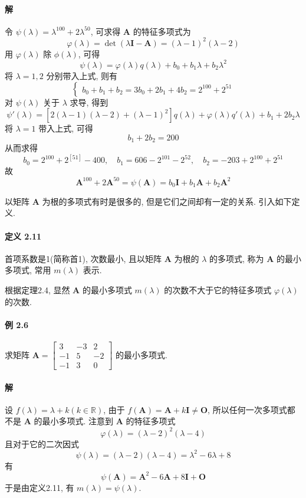 \paragraph*{解} 令 $\psi(\lambda) = \lambda^{100} + 2\lambda^{50}$, 可求得 $\bm{A}$ 的特征多项式为
$$
    \varphi(\lambda) = \det(\lambda\bm{I} - \bm{A}) = (\lambda - 1)^2(\lambda - 2)
$$
用 $\varphi(\lambda)$ 除 $\phi(\lambda)$, 可得
$$
    \psi(\lambda) = \varphi(\lambda)q(\lambda) + b_0 + b_1\lambda + b_2\lambda^2
$$
将 $\lambda = 1,2$ 分别带入上式, 则有
$$
    \begin{cases}
        b_0 + b_1 + b_2 = 3
        b_0 + 2b_1 + 4b_2 = 2^{100} + 2^{51}
    \end{cases}
$$
对 $\psi(\lambda)$ 关于 $\lambda$ 求导, 得到
$$
    \psi'(\lambda) = [2(\lambda - 1)(\lambda - 2) + (\lambda - 1)^2]q(\lambda) + \varphi(\lambda)q'(\lambda) + b_1 + 2b_2\lambda
$$
将 $\lambda = 1$ 带入上式, 可得
$$
    b_1 + 2b_2 = 200
$$
从而求得
$$
    b_0 = 2^{100} + 2^[51] - 400, \quad b_1 = 606 - 2^{101} - 2^{52}, \quad b_2 = -203 + 2^{100} + 2^{51}
$$
故
$$
    \bm{A}^{100} + 2\bm{A}^{50} = \psi(\bm{A}) = b_0\bm{I} + b_1\bm{A} + b_2\bm{A}^2
$$

\par 以矩阵 $\bm{A}$ 为根的多项式有时是很多的, 但是它们之间却有一定的关系. 引入如下定义.

\paragraph*{定义 2.11} 首项系数是1(简称首1), 次数最小, 且以矩阵 $\bm{A}$ 为根的 $\lambda$ 的多项式, 称为 $\bm{A}$
的最小多项式, 常用 $m(\lambda)$ 表示.

\par 根据定理2.4, 显然 $\bm{A}$ 的最小多项式 $m(\lambda)$ 的次数不大于它的特征多项式 $\varphi(\lambda)$ 的次数.

\paragraph*{例 2.6} 求矩阵 $\bm{A} = \begin{bmatrix}
        3  & -3 & 2  \\
        -1 & 5  & -2 \\
        -1 & 3  & 0
    \end{bmatrix}$ 的最小多项式.

\paragraph*{解} 设 $f(\lambda) = \lambda + k (k \in \mathbb{R})$, 由于 $f(\bm{A}) = \bm{A} + k\bm{I} \neq \bm{O}$, 所以任何一次多项式都不是 $\bm{A}$ 的最小多项式. 注意到 $\bm{A}$ 的特征多项式
$$
    \varphi(\lambda) = (\lambda - 2)^2(\lambda - 4)
$$
且对于它的二次因式
$$
    \psi(\lambda) = (\lambda - 2)(\lambda - 4) = \lambda^2 - 6\lambda + 8
$$
有
$$
    \psi(\bm{A}) = \bm{A}^2 - 6\bm{A} + 8\bm{I} + \bm{O}
$$
于是由定义2.11, 有 $m(\lambda) = \psi(\lambda)$.

